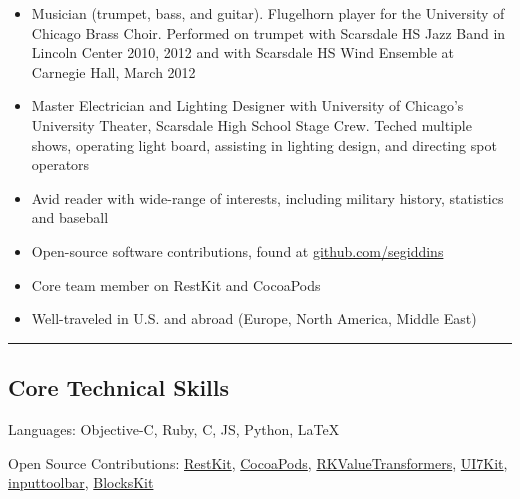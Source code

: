 \documentclass[10pt,letterpaper]{article}
\newcommand{\ahref}[1]
{\href{http://#1}{#1}}
\newcommand{\github}[2]
{\href{https://github.com/#1/#2}{#2}}
\begin{document}
\begin{itemize}[noitemsep, leftmargin=*]
    \item Musician (trumpet, bass, and guitar). Flugelhorn player for the University of Chicago Brass Choir. Performed on trumpet with Scarsdale HS Jazz Band in Lincoln Center 2010, 2012 and with Scarsdale HS Wind Ensemble at Carnegie Hall, March 2012
    \item Master Electrician and Lighting Designer with University of Chicago’s University Theater, Scarsdale High School Stage Crew. Teched multiple shows, operating light board, assisting in lighting design, and directing spot operators
    \item Avid reader with wide-range of interests, including military history, statistics and baseball
    \item Open-source software contributions, found at \ahref{github.com/segiddins}
    \item Core team member on RestKit and CocoaPods
    \item Well-traveled in U.S. and abroad (Europe, North America, Middle East)
\end{itemize}


\hrule
\vspace{-0.4em}
\subsection*{Core Technical Skills}

\begin{description*}
	\item[Languages:]
	    Objective-C,
	    Ruby,
	    C,
	    JS,
	    Python,
	    \LaTeX
	\item[Open Source Contributions:]
	    \github{RestKit}{RestKit},
	    \github{CocoaPods}{CocoaPods},
	    \github{RestKit}{RKValueTransformers},
	    \github{youknowone}{UI7Kit},
	    \github{brandonhamilton}{inputtoolbar},
	    \github{pandamonia}{BlocksKit}
\end{description*}
\end{document}
